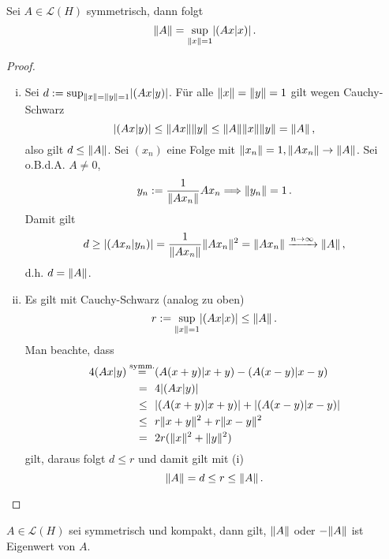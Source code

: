 \begin{satz}\label{satz:7.33}
Sei $A \in \mathcal L(H)$ symmetrisch, dann folgt
\[
	\lVert A\rVert = \sup_{\lVert x\rVert = 1} \lvert (Ax \vert x)\rvert \, .
\]
\end{satz}

\begin{proof}
\begin{enumerate}[(i)]
\item Sei $d := \sup_{\lVert x\rVert = \lVert y\rVert = 1} \lvert (Ax\vert y)\rvert$. Für alle $\lVert x\rVert = \lVert y\rVert = 1$ gilt wegen Cauchy-Schwarz
\begin{dmath*}
	\abs{(Ax\vert y)} \leq \norm{Ax} \norm y \leq \norm A \norm x \norm y = \norm A\, , 
\end{dmath*}
also gilt $d \leq \lVert A\rVert$. Sei $(x_n)$ eine Folge mit $\lVert x_n\rVert = 1, \lVert Ax_n\rVert \rightarrow \lVert A\rVert$. Sei o.B.d.A. $A\neq 0$,
\[
	y_n := \frac 1{\lVert Ax_n\rVert} Ax_n \Longrightarrow \lVert y_n\rVert = 1 \, .
\]
Damit gilt
\begin{dmath*}
	d \geq \abs{(Ax_n \vert y_n)} = \frac 1{\norm{Ax_n}} \norm{Ax_n}^2 = \norm{Ax_n} \xrightarrow{n \ra \infty} \norm A \, , 
\end{dmath*}
d.h. $d = \lVert A\rVert$.
\item Es gilt mit Cauchy-Schwarz (analog zu oben)
\[
	r := \sup_{\lVert x\rVert = 1} \lvert (Ax\vert x)\rvert \leq \lVert A\rVert\, .
\]
Man beachte, dass
\begin{align*}
	4 (Ax\vert y) \stackrel{\scriptsize\text{symm.}}= & (A(x+y)\vert x+y) - (A(x-y)\vert x-y) \\
	= \ \, \,   & 4 \lvert (Ax\vert y)\rvert \\
	\leq \ \, \, & \lvert (A(x+y)\vert x+y)\rvert + \lvert (A(x-y)\vert x-y)\rvert \\
	\leq \ \, \, & r \lVert x+y\rVert^2 + r \lVert x-y\rVert^2 \\
	= \ \, \, & 2r (\lVert x\rVert^2 + \lVert y\rVert^2)
\end{align*}
gilt, daraus folgt $d \leq r$ und damit gilt mit (i)
\[
	\lVert A\rVert = d \leq r \leq \lVert A\rVert \, . \qedhere
\]
\end{enumerate}
\end{proof}

\begin{satz}\label{satz:7.34}
$A \in \mathcal L(H)$ sei symmetrisch und kompakt, dann gilt, $\lVert A\rVert$ oder $-\lVert A\rVert$ ist Eigenwert von $A$.
\end{satz}


